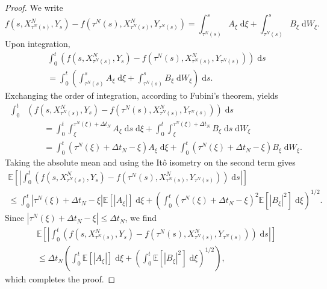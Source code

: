 \documentclass[reqno,12pt]{amsart}
\theoremstyle{plain}%
\theoremstyle{definition}
\begin{document}
\begin{proof}
    We write
    \[
        f(s, X_{\tau^N(s)}^N, Y_s) - f(\tau^N(s), X_{\tau^N(s)}^N, Y_{\tau^N(s)}) = \int_{\tau^N(s)}^s A_\xi \;\mathrm{d}\xi + \int_{\tau^N(s)}^s B_\xi \;\mathrm{d}W_\xi.
    \]
    Upon integration,
    \begin{multline*}
        \int_0^t \left(f(s, X_{\tau^N(s)}^N, Y_s) - f(\tau^N(s), X_{\tau^N(s)}^N, Y_{\tau^N(s)})\right)\;\mathrm{d}s  \\
        = \int_0^t \left(\int_{\tau^N(s)}^s A_\xi \;\mathrm{d}\xi + \int_{\tau^N(s)}^s B_\xi \;\mathrm{d}W_\xi\right)\;\mathrm{d}s.
    \end{multline*}
    Exchanging the order of integration, according to Fubini's theorem, yields
    \begin{align*}
        \int_0^t & \left(f(s, X_{\tau^N(s)}^N, Y_s) - f(\tau^N(s), X_{\tau^N(s)}^N, Y_{\tau^N(s)})\right)\;\mathrm{d}s \\
        & \qquad = \int_0^t \int_\xi^{\tau^N(\xi)+\Delta t_N} A_\xi \;\mathrm{d}s\;\mathrm{d}\xi + \int_0^t \int_\xi^{\tau^N(\xi) + \Delta t_N} B_\xi \;\mathrm{d}s\;\mathrm{d}W_\xi \\
        & \qquad = \int_0^t (\tau^N(\xi)+\Delta t_N - \xi) A_\xi \;\mathrm{d}\xi + \int_0^t (\tau^N(\xi) + \Delta t_N - \xi) B_\xi \;\mathrm{d}W_\xi.
    \end{align*}
    Taking the absolute mean and using the It\^o isometry \cite{Oksendal2003} on the second term gives
    \begin{multline*}
        \mathbb{E}\left[\left|\int_0^t \left(f(s, X_{\tau^N(s)}^N, Y_s) - f(\tau^N(s), X_{\tau^N(s)}^N, Y_{\tau^N(s)})\right)\;\mathrm{d}s\right|\right]  \\
        \leq \int_0^t |\tau^N(\xi)+\Delta t_N - \xi| \mathbb{E}[|A_\xi|] \;\mathrm{d}\xi + \left(\int_0^t (\tau^N(\xi) + \Delta t_N - \xi)^2 \mathbb{E}[|B_\xi|^2] \;\mathrm{d}\xi \right)^{1/2}.
    \end{multline*}
    Since $|\tau^N(\xi)+\Delta t_N - \xi| \leq \Delta t_N$, we find
    \begin{multline*}
        \mathbb{E}\left[\left|\int_0^t \left(f(s, X_{\tau^N(s)}^N, Y_s) - f(\tau^N(s), X_{\tau^N(s)}^N, Y_{\tau^N(s)})\right)\;\mathrm{d}s\right|\right]  \\
        \leq \Delta t_N \left(\int_0^t \mathbb{E}[|A_\xi|] \;\mathrm{d}\xi + \left(\int_0^t \mathbb{E}[|B_\xi|^2] \;\mathrm{d}\xi \right)^{1/2}\right),
    \end{multline*}
    which completes the proof.
\end{proof}
\end{document}
